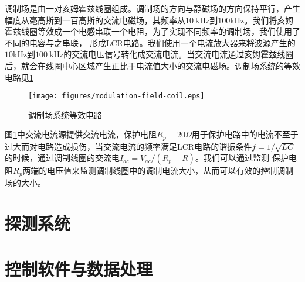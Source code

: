         
        调制场是由一对亥姆霍兹线圈组成。调制场的方向与静磁场的方向保持平行，产生幅度从毫高斯到一百高斯的交流电磁场，其频率从$10~$kHz到$100$kHz。我们将亥姆霍兹线圈等效成一个电感串联一个电阻，为了实现不同频率的调制场，我们使用了不同的电容与之串联，
        形成LCR电路。我们使用一个电流放大器来将波源产生的$10$kHz到$100~$kHz的交流电压信号转化成交流电流。当交流电流通过亥姆霍兹线圈后，就会在线圈中心区域产生正比于电流值大小的交流电磁场。调制场系统的等效电路见\ref{modulation-field-coil}
            \begin{figure}[htbp]
                \begin{center}
                    \texttt{[image: figures/modulation-field-coil.eps]}
                    \caption{调制场系统等效电路
                    }
                    \label{modulation-field-coil}
                \end{center}
            \end{figure}
        
        
        图\ref{modulation-field-coil}中交流电流源提供交流电流，保护电阻$R_p=20\Omega$用于保护电路中的电流不至于过大而对电路造成损伤，当交流电流的频率满足LCR电路的谐振条件$f=1/\sqrt{LC}$的时候，通过调制线圈的交流电$I_{ac}=V_{ac}/(R_p+R)$。我们可以通过监测
        保护电阻$R_p$两端的电压值来监测调制线圈中的调制电流大小，从而可以有效的控制调制场的大小。
    \section{探测系统}
    \section{控制软件与数据处理}




